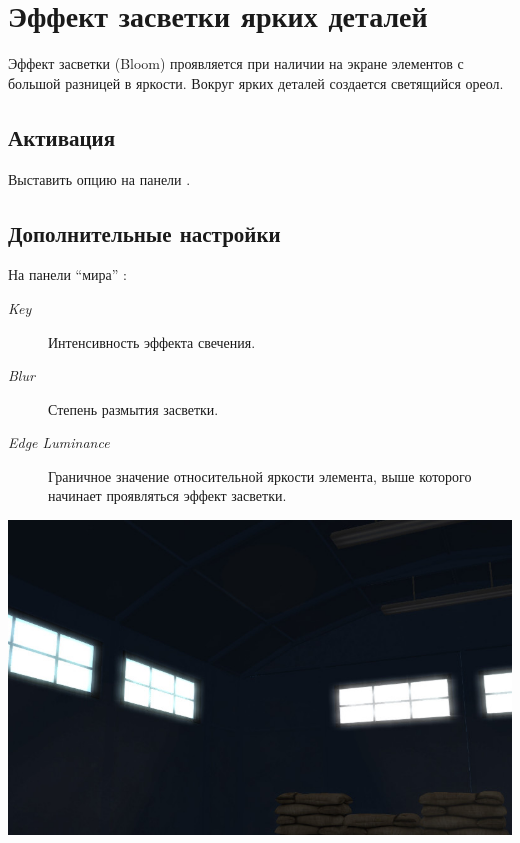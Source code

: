 \documentclass[a4paper,12pt,oneside]{sphinxmanual}
\begin{document}
\section{Эффект засветки ярких деталей}
\label{postprocessing_effects:id23}
Эффект засветки (Bloom) проявляется при наличии на экране элементов с большой разницей в яркости. Вокруг ярких деталей создается светящийся ореол.


\subsection{Активация}
\label{postprocessing_effects:id24}
Выставить опцию  на панели .


\subsection{Дополнительные настройки}
\label{postprocessing_effects:id25}
На панели ``мира'' :
\begin{description}
\item[{\emph{Key}}] \leavevmode
Интенсивность эффекта свечения.

\item[{\emph{Blur}}] \leavevmode
Степень размытия засветки.

\item[{\emph{Edge Luminance}}] \leavevmode
Граничное значение относительной яркости элемента, выше которого начинает проявляться эффект засветки.

\end{description}

{\hfill\includegraphics[width=1.000\linewidth]{bloom.jpg}\hfill}
\end{document}
